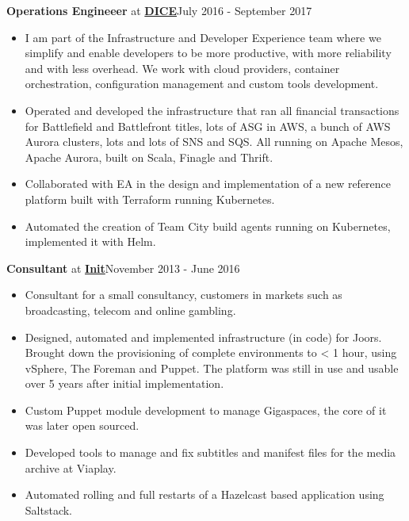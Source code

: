 \documentclass[10pt,sans]{moderncv}
\newenvironment{outerlist}[1][\enskip\textbullet]%
        {\begin{itemize}[#1]}{\end{itemize}%
         \vspace{-.6\baselineskip}}
\newcommand{\blankline}{\quad\pagebreak[2]}
\begin{document}
\textbf{Operations Engineeer} at \href{http://www.dice.se}{\textbf{DICE}}\hfill {July 2016 - September 2017}
\begin{outerlist}
\item[]I am part of the Infrastructure and Developer Experience team where we simplify and enable developers to be more productive, with more reliability and with less overhead. We work with cloud providers, container orchestration, configuration management and custom tools development.

\item Operated and developed the infrastructure that ran all financial transactions for Battlefield and Battlefront titles, lots of ASG in AWS, a bunch of AWS Aurora clusters, lots and lots of SNS and SQS. All running on Apache Mesos, Apache Aurora, built on Scala, Finagle and Thrift.
\item Collaborated with EA in the design and implementation of a new reference platform built with Terraform running Kubernetes. 
\item Automated the creation of Team City build agents running on Kubernetes, implemented it with Helm.
\end{outerlist}
\blankline

\textbf{Consultant} at \href{http://www.init.se}{\textbf{Init}}\hfill {November 2013 - June 2016}
\begin{outerlist}
\item[] Consultant for a small consultancy, customers in markets such as broadcasting, telecom and online gambling.

	\item Designed, automated and implemented infrastructure (in code) for Joors. Brought down the provisioning of complete environments to < 1 hour,
		using vSphere, The Foreman and Puppet. The platform was still in use and usable over 5 years after initial implementation.
	\item Custom Puppet module development to manage Gigaspaces, the core of it was later open sourced.
	\item Developed tools to manage and fix subtitles and manifest files for the media archive at Viaplay.
	\item Automated rolling and full restarts of a Hazelcast based application using Saltstack.
\end{outerlist}
\blankline
\end{document}
